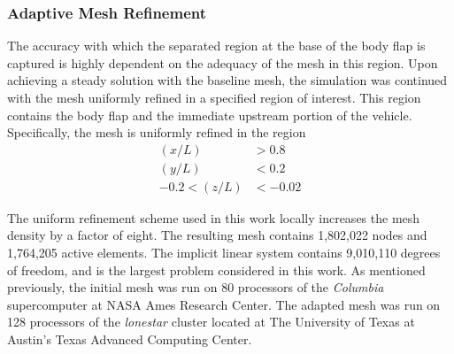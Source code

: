\subsubsection{Adaptive Mesh Refinement\label{sec:x38-amr}}
The accuracy with which the separated region at the base of the body flap is captured is highly dependent on the adequacy of the mesh in this region.  Upon achieving a steady solution with the baseline mesh, the simulation was continued with the mesh uniformly refined in a specified region of interest.  This region contains the body flap and the immediate upstream portion of the vehicle.  Specifically, the mesh is uniformly refined in the region 
\begin{align*}
 (x/L) &> 0.8 \\
 (y/L) &< 0.2 \\
-0.2<(z/L)&<-0.02 
\end{align*}

The uniform refinement scheme used in this work locally increases the mesh density by a factor of eight.  The resulting mesh contains 1,802,022 nodes and 1,764,205 active elements.  The implicit linear system contains 9,010,110 degrees of freedom, and is the largest problem considered in this work.  As mentioned previously, the initial mesh was run on 80 processors of the \emph{Columbia} supercomputer at NASA Ames Research Center.  The adapted mesh was run on 128 processors of the \emph{lonestar} cluster located at The University of Texas at Austin's Texas Advanced Computing Center.

